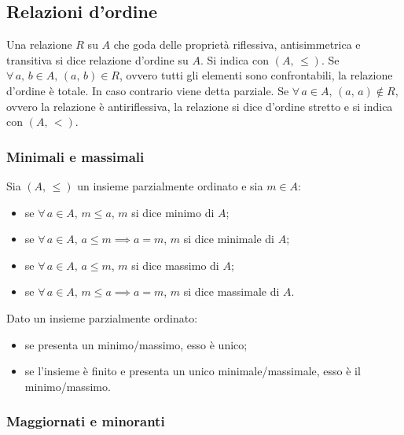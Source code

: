 \documentclass[10pt]{article}
\begin{document}
        \newpage

        \subsection*{Relazioni d'ordine}

            Una relazione \(R\) su \(A\) che goda delle proprietà riflessiva, antisimmetrica e transitiva si dice relazione
            d'ordine su \(A\). Si indica con \((A, \, \leqslant)\). Se \(\forall \, a, \, b \in A, \, (a, \, b) \in R\), ovvero
            tutti gli elementi sono confrontabili, la relazione d'ordine è totale. In caso contrario viene detta parziale.
            Se \(\forall \, a \in A, \, (a, \, a) \notin R\), ovvero la relazione è antiriflessiva, la relazione si dice d'ordine
            stretto e si indica con \((A, \, <)\).

            \subsubsection*{Minimali e massimali}

                Sia \((A, \, \leqslant)\) un insieme parzialmente ordinato e sia \(m \in A\):
                \begin{itemize}
                    \item se \(\forall \, a \in A, \, m \leqslant a\), \(m\) si dice minimo di \(A\);
                    \item se \(\forall \, a \in A, \, a \leqslant m \implies a = m\), \(m\) si dice minimale di \(A\);
                    \item se \(\forall \, a \in A, \, a \leqslant m\), \(m\) si dice massimo di \(A\);
                    \item se \(\forall \, a \in A, \, m \leqslant a \implies a = m\), \(m\) si dice massimale di \(A\).
                \end{itemize}

                Dato un insieme parzialmente ordinato:
                \begin{itemize}
                    \item se presenta un minimo/massimo, esso è unico;
                    \item se l'insieme è finito e presenta un unico minimale/massimale, esso è il minimo/massimo.
                \end{itemize}

            \subsubsection*{Maggiornati e minoranti}
\end{document}
